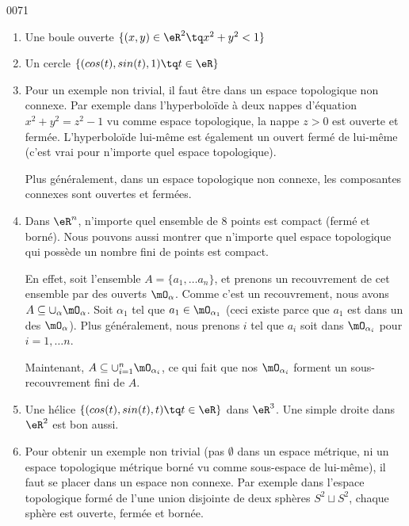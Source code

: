 
\begin{corrige}{0071}

\begin{enumerate}
	\item Une boule ouverte $\{ (x,y) \in \eR^2 \tq x^2+y^2 < 1\}$
	\item Un cercle $\{ (cos(t),sin(t),1) \tq t \in \eR\}$
	\item Pour un exemple non trivial, il faut être dans un espace topologique non connexe. Par exemple dans l'hyperboloïde à deux nappes d'équation $x^2 + y^2 = z^2 - 1$ vu comme espace topologique, la nappe $z > 0$ est ouverte et fermée. L'hyperboloïde lui-même est également un ouvert fermé de lui-même (c'est vrai pour n'importe quel espace topologique).

		Plus généralement, dans un espace topologique non connexe, les composantes connexes sont ouvertes et fermées.
	\item Dans $\eR^n$, n'importe quel ensemble de $8$ points est compact (fermé et borné). Nous pouvons aussi montrer que n'importe quel espace topologique qui possède un nombre fini de points est compact. 

En effet, soit l'ensemble $A=\{ a_1,\ldots a_n \}$, et prenons un recouvrement de cet ensemble par des ouverts $\mO_{\alpha}$. Comme c'est un recouvrement, nous avons $A\subseteq\cup_{\alpha}\mO_{\alpha}$. Soit $\alpha_1$ tel que $a_1\in\mO_{\alpha_1}$ (ceci existe parce que $a_1$ est dans un des $\mO_{\alpha}$). Plus généralement, nous prenons $i$ tel que $a_i$ soit dans $\mO_{\alpha_i}$ pour $i=1,\ldots n$. 

Maintenant, $A\subseteq\cup_{i=1}^n\mO_{\alpha_i}$, ce qui fait que nos $\mO_{\alpha_i}$ forment un sous-recouvrement fini de $A$.

	\item Une hélice $\{ (cos(t),sin(t),t) \tq t \in \eR\}$ dans $\eR^3$. Une simple droite dans $\eR^2$ est bon aussi.
	\item Pour obtenir un exemple non trivial (pas $\emptyset$ dans un espace métrique, ni un espace topologique métrique borné vu comme sous-espace de lui-même), il faut se placer dans un espace non connexe. Par exemple dans l'espace topologique formé de l'une union disjointe de deux sphères $S^2 \sqcup S^2$, chaque sphère est ouverte, fermée et bornée.
\end{enumerate}

\end{corrige}
